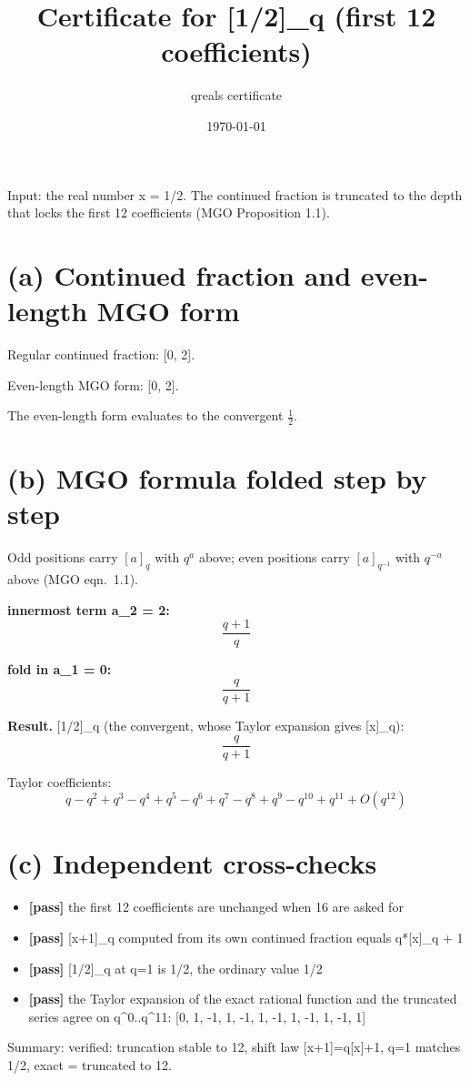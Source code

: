 \documentclass[11pt]{article}
\title{Certificate for [1/2]\_q (first 12 coefficients)}
\author{qreals certificate}
\date{\today}
\begin{document}
\maketitle

\noindent Input: the real number x = 1/2. The continued fraction is truncated to the depth that locks the first 12 coefficients (MGO Proposition 1.1).

\section*{(a) Continued fraction and even-length MGO form}
Regular continued fraction: [0, 2]. \par
Even-length MGO form: [0, 2]. \par
The even-length form evaluates to the convergent $ \frac{1}{2} $.\par

\section*{(b) MGO formula folded step by step}
Odd positions carry $[a]_q$ with $q^a$ above; even positions carry
$[a]_{q^{-1}}$ with $q^{-a}$ above (MGO eqn.~1.1).

\noindent\textbf{innermost term a\_2 = 2:}
{\footnotesize%
\begin{dmath*}
\frac{q + 1}{q}
\end{dmath*}
}

\noindent\textbf{fold in a\_1 = 0:}
{\footnotesize%
\begin{dmath*}
\frac{q}{q + 1}
\end{dmath*}
}

\noindent\textbf{Result.} [1/2]\_q (the convergent, whose Taylor expansion gives [x]\_q):
{\footnotesize%
\begin{dmath*}
\frac{q}{q + 1}
\end{dmath*}
}

\noindent Taylor coefficients:
{\small%
\begin{dmath*}
q - q^{2} + q^{3} - q^{4} + q^{5} - q^{6} + q^{7} - q^{8} + q^{9} - q^{10} + q^{11} + O(q^{12})
\end{dmath*}
}

\section*{(c) Independent cross-checks}
\begin{itemize}
\item \textbf{[pass]} the first 12 coefficients are unchanged when 16 are asked for
\item \textbf{[pass]} [x+1]\_q computed from its own continued fraction equals q*[x]\_q + 1
\item \textbf{[pass]} [1/2]\_q at q=1 is 1/2, the ordinary value 1/2
\item \textbf{[pass]} the Taylor expansion of the exact rational function and the truncated series agree on q\textasciicircum{}0..q\textasciicircum{}11: [0, 1, -1, 1, -1, 1, -1, 1, -1, 1, -1, 1]
\end{itemize}
Summary: verified: truncation stable to 12, shift law [x+1]=q[x]+1, q=1 matches 1/2, exact = truncated to 12.
\end{document}
